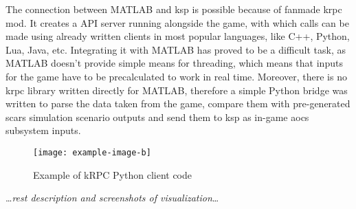         The connection between MATLAB and \ac{ksp} is possible because of fanmade \ac{krpc} mod. It creates a API server running alongside the game, with which calls can be made using already written clients in most popular languages, like C++, Python, Lua, Java, etc. Integrating it with MATLAB has proved to be a difficult task, as MATLAB doesn't provide simple means for threading, which means that inputs for the game have to be precalculated to work in real time. Moreover, there is no \ac{krpc} library written directly for MATLAB, therefore a simple Python bridge was written to parse the data taken from the game, compare them with pre-generated \ac{scars} simulation scenario outputs and send them to \ac{ksp} as in-game \ac{aocs} subsystem inputs.

        \begin{figure}[H]
            \centering
            \texttt{[image: example-image-b]}
            \caption{Example of kRPC Python client code}
            \label{fig:krcp}
        \end{figure}

        \dots\textit{rest description and screenshots of visualization}\dots